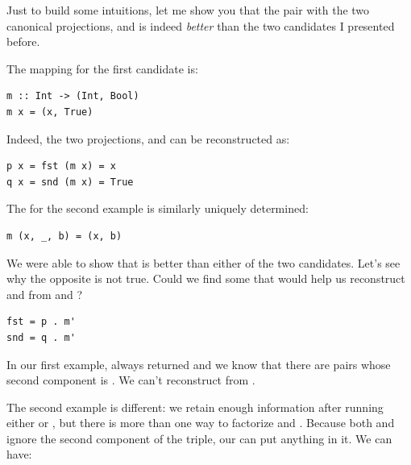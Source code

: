 Just to build some intuitions, let me show you that the pair
 with the two canonical projections, 
and  is indeed \emph{better} than the two candidates I
presented before.

\begin{figure}[H]
\centering
{}
\end{figure}

\noindent
The mapping  for the first candidate is:

\begin{verbatim}
m :: Int -> (Int, Bool)
m x = (x, True)
\end{verbatim}
Indeed, the two projections,  and  can be
reconstructed as:

\begin{verbatim}
p x = fst (m x) = x
q x = snd (m x) = True
\end{verbatim}
The  for the second example is similarly uniquely determined:

\begin{verbatim}
m (x, _, b) = (x, b)
\end{verbatim}
We were able to show that  is better than either of
the two candidates. Let's see why the opposite is not true. Could we
find some  that would help us reconstruct 
and  from  and ?

\begin{verbatim}
fst = p . m'
snd = q . m'
\end{verbatim}
In our first example,  always returned  and we
know that there are pairs whose second component is . We
can't reconstruct  from .

The second example is different: we retain enough information after
running either  or , but there is more than one way
to factorize  and . Because both  and
 ignore the second component of the triple, our 
can put anything in it. We can have:

